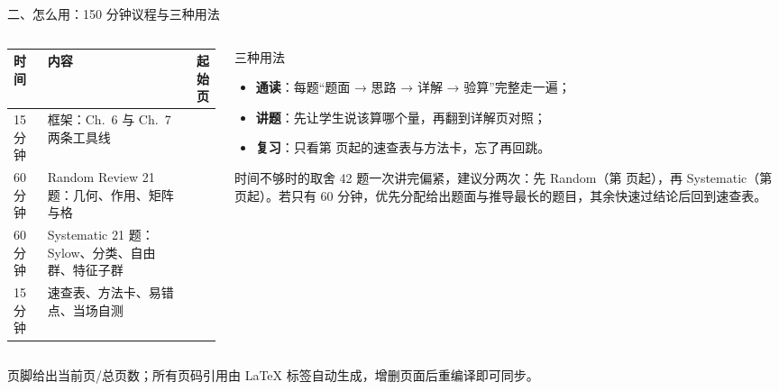 \documentclass[aspectratio=169,10pt,fontset=none]{ctexbeamer}
\begin{document}
\begin{frame}[t]{二、怎么用：150 分钟议程与三种用法}
  \label{sec:agenda}
  \begin{columns}[T,onlytextwidth]
    \begin{column}{0.54\textwidth}
      \centering
      \scriptsize
      \setlength{\tabcolsep}{3pt}
      \renewcommand{\arraystretch}{1.2}
      \begin{tabular}{@{}l l r@{}}
        \toprule
        时间 & 内容 & 起始页\\
        \midrule
        15 分钟 & 框架：Ch.~6 与 Ch.~7 两条工具线 & \pageref{sec:framework1}\\
        60 分钟 & Random Review 21 题：几何、作用、矩阵与格 & \pageref{sec:random}\\
        60 分钟 & Systematic 21 题：Sylow、分类、自由群、特征子群 & \pageref{sec:sys}\\
        15 分钟 & 速查表、方法卡、易错点、当场自测 & \pageref{sec:answers}\\
        \bottomrule
      \end{tabular}
    \end{column}
    \begin{column}{0.43\textwidth}
      \begin{block}{\footnotesize 三种用法}
        \scriptsize
        \begin{itemize}\setlength{\itemsep}{1pt}
          \item \textbf{通读}：每题“题面 → 思路 → 详解 → 验算”完整走一遍；
          \item \textbf{讲题}：先让学生说该算哪个量，再翻到详解页对照；
          \item \textbf{复习}：只看第 \pageref{sec:answers} 页起的速查表与方法卡，忘了再回跳。
        \end{itemize}
      \end{block}
      \begin{alertblock}{\footnotesize 时间不够时的取舍}
        \scriptsize
        42 题一次讲完偏紧，建议分两次：先 Random（第 \pageref{sec:random} 页起），再 Systematic（第 \pageref{sec:sys} 页起）。若只有 60 分钟，优先分配给出题面与推导最长的题目，其余快速过结论后回到速查表。
      \end{alertblock}
    \end{column}
  \end{columns}
  \vspace{0.2em}
  {\scriptsize\color{ink!70} 页脚给出当前页/总页数；所有页码引用由 \LaTeX{} 标签自动生成，增删页面后重编译即可同步。}
\end{frame}
\end{document}
